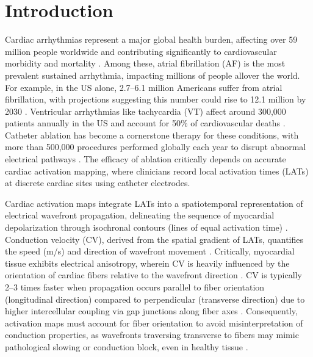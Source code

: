 \section{Introduction}

Cardiac arrhythmias represent a major global health burden, affecting over 59 million people worldwide and contributing significantly to cardiovascular morbidity and mortality \cite{roth2020}. Among these, atrial fibrillation (AF) is the most prevalent sustained arrhythmia, impacting millions of people allover the world. For example, in the US alone, 2.7–6.1 million Americans suffer from atrial fibrillation, with projections suggesting this number could rise to 12.1 million by 2030 \cite{roth2020, Colilla2013}. Ventricular arrhythmias like tachycardia (VT) affect around 300,000 patients annually in the US and account for 50\% of cardiovascular deaths \cite{AlKhatib2018}. Catheter ablation has become a cornerstone therapy for these conditions, with more than 500,000 procedures performed globally each year to disrupt abnormal electrical pathways \cite{Calkins2017}. The efficacy of ablation critically depends on accurate cardiac activation mapping, where clinicians record local activation times (LATs) at discrete cardiac sites using catheter electrodes.

Cardiac activation maps integrate LATs into a spatiotemporal representation of electrical wavefront propagation, delineating the sequence of myocardial depolarization through isochronal contours (lines of equal activation time) \cite{DURRER1970}. Conduction velocity (CV), derived from the spatial gradient of LATs, quantifies the speed (m/s) and direction of wavefront movement \cite{ColliFranzone1998}. Critically, myocardial tissue exhibits electrical anisotropy, wherein CV is heavily influenced by the orientation of cardiac fibers relative to the wavefront direction \cite{Spach1981}. CV is typically 2–3 times faster when propagation occurs parallel to fiber orientation (longitudinal direction) compared to perpendicular (transverse direction) due to higher intercellular coupling via gap junctions along fiber axes \cite{Spach1981,KLBER2004}. Consequently, activation maps must account for fiber orientation to avoid misinterpretation of conduction properties, as wavefronts traversing transverse to fibers may mimic pathological slowing or conduction block, even in healthy tissue \cite{Spach1981,Taccardi1994}.
